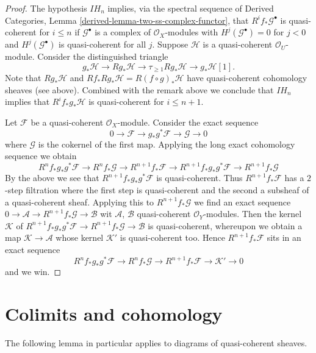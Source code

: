 \begin{proof}
\medskip\noindent
The hypothesis $IH_n$ implies, via the spectral sequence of
Derived Categories, Lemma \ref{derived-lemma-two-ss-complex-functor},
that $R^if_*\mathcal{G}^\bullet$ is quasi-coherent for $i \leq n$ if
$\mathcal{G}^\bullet$ is a complex of $\mathcal{O}_X$-modules with
$H^j(\mathcal{G}^\bullet) = 0$ for $j < 0$ and $H^j(\mathcal{G}^\bullet)$
is quasi-coherent for all $j$. Suppose $\mathcal{H}$ is
a quasi-coherent $\mathcal{O}_U$-module. Consider the distinguished triangle
$$
g_*\mathcal{H} \to Rg_*\mathcal{H} \to
\tau_{\geq 1}Rg_*\mathcal{H} \to g_*\mathcal{H}[1].
$$
Note that $Rg_*\mathcal{H}$ and
$Rf_*Rg_*\mathcal{H} = R(f \circ g)_*\mathcal{H}$
have quasi-coherent cohomology sheaves (see above). Combined with
the remark above we conclude that $IH_n$ implies that
$R^if_*g_*\mathcal{H}$ is quasi-coherent for $i \leq n + 1$.

\medskip\noindent
Let $\mathcal{F}$ be a quasi-coherent $\mathcal{O}_X$-module. Consider
the exact sequence
$$
0 \to \mathcal{F} \to g_*g^*\mathcal{F} \to \mathcal{G} \to 0
$$
where $\mathcal{G}$ is the cokernel of the first map.
Applying the long exact cohomology sequence we obtain
$$
R^nf_*g_*g^*\mathcal{F} \to
R^nf_*\mathcal{G} \to
R^{n + 1}f_*\mathcal{F} \to
R^{n + 1}f_*g_*g^*\mathcal{F} \to
R^{n + 1}f_*\mathcal{G}
$$
By the above we see that $R^{n + 1}f_*g_*g^*\mathcal{F}$
is quasi-coherent. Thus $R^{n + 1}f_*\mathcal{F}$ has a $2$-step filtration
where the first step is quasi-coherent and the second a subsheaf of
a quasi-coherent sheaf. Applying this to $R^{n + 1}f_*\mathcal{G}$
we find an exact sequence $0 \to \mathcal{A} \to R^{n + 1}f_*\mathcal{G}
\to \mathcal{B}$ wit $\mathcal{A}$, $\mathcal{B}$ quasi-coherent
$\mathcal{O}_Y$-modules. Then the kernel $\mathcal{K}$ of
$R^{n + 1}f_*g_*g^*\mathcal{F} \to R^{n + 1}f_*\mathcal{G}
\to \mathcal{B}$ is quasi-coherent, whereupon we obtain a map
$\mathcal{K} \to \mathcal{A}$ whose kernel $\mathcal{K}'$ is
quasi-coherent too. Hence $R^{n + 1}f_*\mathcal{F}$ sits in an exact
sequence
$$
R^nf_*g_*g^*\mathcal{F} \to
R^nf_*\mathcal{G} \to
R^{n + 1}f_*\mathcal{F} \to \mathcal{K}' \to 0
$$
and we win.
\end{proof}




\section{Colimits and cohomology}
\label{section-colimits}

\noindent
The following lemma in particular applies to diagrams of quasi-coherent
sheaves.

